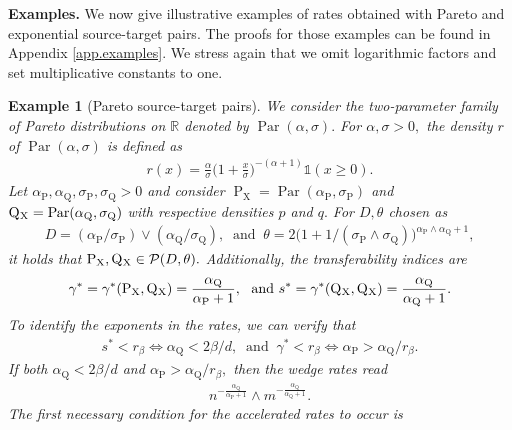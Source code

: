 \documentclass[10pt]{article}
\newcommand{\mP}{\mathcal{P}}
\newcommand{\RR}{\mathbb{R}}
\renewcommand{\P}{\operatorname{P}}
\newcommand{\Q}{\operatorname{Q}}
\newcommand{\Par}{\operatorname{Par}}
\newcommand{\sX}{\mathrm{X}}
\newtheorem{example}[theorem]{Example}
\begin{document}
\noindent\textbf{Examples.} We now give illustrative examples of rates obtained with Pareto and exponential source-target pairs. The proofs for those examples can be found in Appendix \ref{app.examples}. We stress again that we omit logarithmic factors and set multiplicative constants to one.
\begin{example}[Pareto source-target pairs]
    \label{ex.pareto}
    We consider the two-parameter family of Pareto distributions on $\RR$ denoted by $\Par(\alpha, \sigma).$ For $\alpha, \sigma > 0,$ the density $r$ of $\Par(\alpha, \sigma)$ is defined as
    \begin{align*}
        r(x) = \frac{\alpha}{\sigma}\Big(1 + \frac{x}{\sigma}\Big)^{-(\alpha+1)}\mathds{1}(x\geq 0).
    \end{align*}
    Let $\alpha_{\P}, \alpha_{\Q}, \sigma_{\P}, \sigma_{\Q} > 0$ and consider $\P_{\sX} = \Par(\alpha_{\P}, \sigma_{\P})$ and $\Q\mathstrut_{\!\sX} = \Par(\alpha_{\Q}, \sigma_{\Q})$ with respective densities $p$ and $q.$ For $D, \theta$ chosen as
    \begin{align*}
        D = (\alpha_{\P}/\sigma_{\P})\vee(\alpha_{\Q}/\sigma_{\Q}), \ \text{ and } \ \theta = 2\big(1 + 1/(\sigma_{\P}\wedge\sigma_{\Q})\big)^{\alpha_{\P}\wedge\alpha_{\Q} + 1},
    \end{align*}
    it holds that $\P_{\sX}, \Q\mathstrut_{\!\sX} \in \mP(D, \theta).$ Additionally, the transferability indices are
    \begin{align*}
        \gamma^* = \gamma^*(\P_{\sX}, \Q\mathstrut_{\!\sX}) = \frac{\alpha_{\Q}}{\alpha_{\P} + 1}, \ \text{ and } s^* = \gamma^*(\Q\mathstrut_{\!\sX}, \Q\mathstrut_{\!\sX}) = \frac{\alpha_{\Q}}{\alpha_{\Q} + 1}.
    \end{align*}
    To identify the exponents in the rates, we can verify that
    \begin{align*}
        s^* < r_\beta \Leftrightarrow \alpha_{\Q} < 2\beta/d, \ \text{ and } \ \gamma^* < r_\beta \Leftrightarrow \alpha_{\P} > \alpha_{\Q}/r_\beta.
    \end{align*}
    If both $\alpha_{\Q} < 2\beta/d$ and $\alpha_{\P} > \alpha_{\Q}/r_\beta,$ then the wedge rates read
    \begin{align*}
        n^{-\tfrac{\alpha_{\Q}}{\alpha_{\P} + 1}} \wedge m^{-\tfrac{\alpha_{\Q}}{\alpha_{\Q} + 1}}.
    \end{align*}
    The first necessary condition for the  accelerated rates to occur is
    \begin{align}
        \label{eq.accel.pareto}

\end{align}
\end{example}
\end{document}

